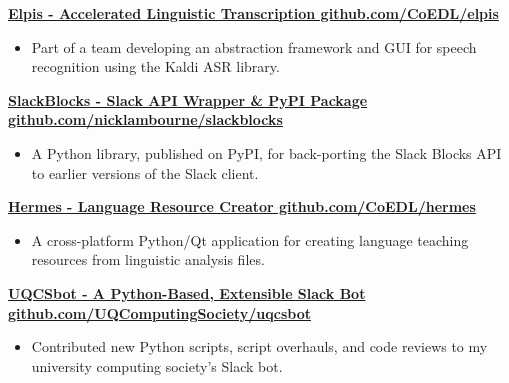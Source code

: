 \documentclass[a4paper]{article}
\newenvironment{singleitem}
{   \small
    \vspace{0pt}
    \begin{itemize}
    \setlength{\itemsep}{0pt}
    \setlength{\parskip}{0pt}
    \setlength{\parsep}{0pt}   }
{\end{itemize} \vspace{1pt}	}
\begin{document}
\textbf{\href{https://github.com/CoEDL/elpis}{Elpis - Accelerated Linguistic Transcription \hfill github.com/CoEDL/elpis}}
\begin{singleitem}
	\item Part of a team developing an abstraction framework and GUI for speech recognition using the Kaldi ASR library.
\end{singleitem}

\textbf{\href{https://github.com/nicklambourne/slackblocks}{SlackBlocks - Slack API Wrapper \& PyPI Package \hfill github.com/nicklambourne/slackblocks}}
\begin{singleitem}
	\item A Python library, published on PyPI, for back-porting the Slack Blocks API to earlier versions of the Slack client.
\end{singleitem}

\textbf{\href{https://github.com/CoEDL/hermes}{Hermes - Language Resource Creator \hfill github.com/CoEDL/hermes}}
\begin{singleitem}
	\item A cross-platform Python/Qt application for creating language teaching resources from linguistic analysis files.
\end{singleitem}


\textbf{\href{https://github.com/UQComputingSociety/uqcsbot}{UQCSbot - A Python-Based, Extensible Slack Bot \hfill github.com/UQComputingSociety/uqcsbot}}
\begin{singleitem}
	\item Contributed new Python scripts, script overhauls, and code reviews to my university computing society's Slack bot.
\end{singleitem}



\end{document}
